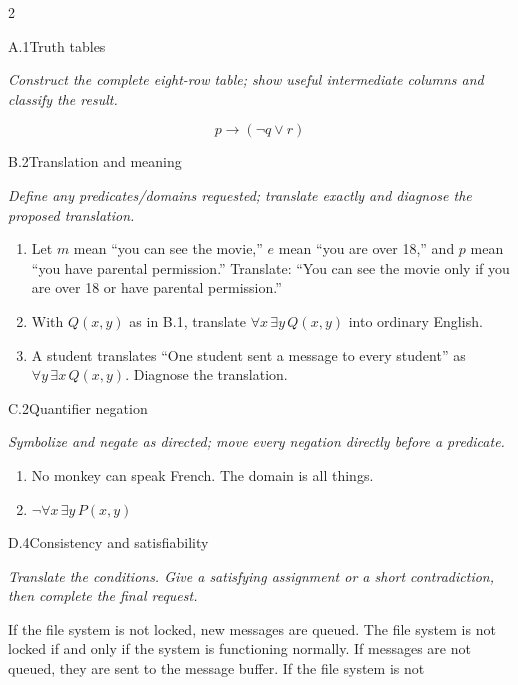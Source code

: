 \documentclass[9pt]{extarticle}
\begin{document}
\CoreWorkArea
\FormBreak
{}
\begin{multicols}{2}
\begin{CoreProblem}{A.1}{Truth tables}
{\scriptsize\textit{Construct the complete eight-row table; show useful intermediate columns and classify the result.}\par}
\[
  p\to(\neg q\lor r)
\]
\end{CoreProblem}
\begin{CoreProblem}{B.2}{Translation and meaning}
{\scriptsize\textit{Define any predicates/domains requested; translate exactly and diagnose the proposed translation.}\par}
\begin{enumerate}[label=(\alph*)]
  \item Let $m$ mean ``you can see the movie,'' $e$ mean ``you are over 18,''
        and $p$ mean ``you have parental permission.'' Translate: ``You can
        see the movie only if you are over 18 or have parental permission.''
  \item With $Q(x,y)$ as in B.1, translate $\forall x\,\exists y\,Q(x,y)$
        into ordinary English.
  \item A student translates ``One student sent a message to every student''
        as $\forall y\,\exists x\,Q(x,y)$. Diagnose the translation.
\end{enumerate}
\end{CoreProblem}
\begin{CoreProblem}{C.2}{Quantifier negation}
{\scriptsize\textit{Symbolize and negate as directed; move every negation directly before a predicate.}\par}
\begin{enumerate}[label=(\alph*)]
  \item No monkey can speak French. The domain is all things.
  \item $\neg\forall x\,\exists y\,P(x,y)$
\end{enumerate}
\end{CoreProblem}
\columnbreak
\begin{CoreProblem}{D.4}{Consistency and satisfiability}
{\scriptsize\textit{Translate the conditions. Give a satisfying assignment or a short contradiction, then complete the final request.}\par}
If the file system is not locked, new messages are queued. The file system is
not locked if and only if the system is functioning normally. If messages are
not queued, they are sent to the message buffer. If the file system is not

\end{CoreProblem}
\end{multicols}
\end{document}
